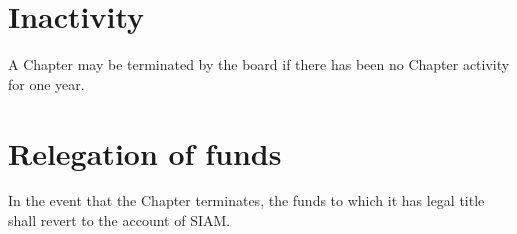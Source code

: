 \documentclass{ronr-bylaws}
\begin{document}
\section{Inactivity}
A Chapter may be terminated by the board if there has been no Chapter activity for
one year.

\section{Relegation of funds}
In the event that the Chapter terminates, the funds to which it has legal title shall
revert to the account of SIAM.
\end{document}
